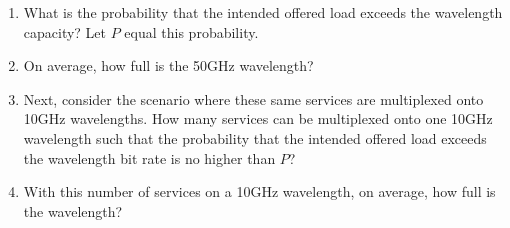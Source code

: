 \documentclass[a4paper]{article}
\begin{document}
\begin{enumerate}[label=\alph*-]
\item
What is the probability that the intended offered load exceeds the wavelength capacity? Let $P$ equal this probability.
\item
On average, how full is the 50GHz wavelength?
\item
Next, consider the scenario where these same services are multiplexed onto 10GHz wavelengths. How many services can be multiplexed onto one 10GHz wavelength such that the probability that the intended offered load exceeds the wavelength bit rate is no higher than $P$?
\item
With this number of services on a 10GHz wavelength, on average, how full is the wavelength?
\end{enumerate}

\end{document}
